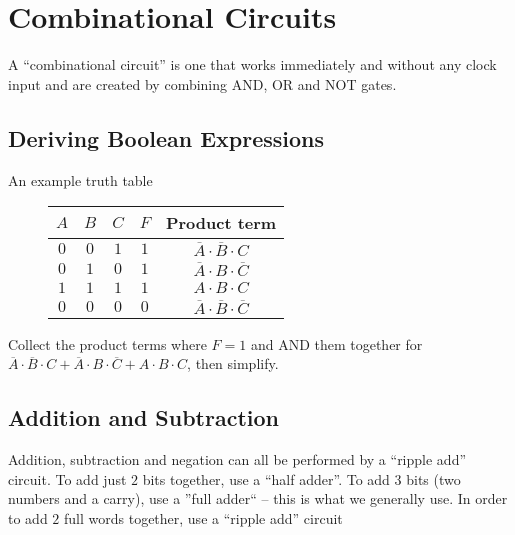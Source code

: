 \section{Combinational Circuits}\label{sec:combinational_circuits}

A ``combinational circuit'' is one that works immediately and without any clock input and are created by combining AND, OR and NOT gates.

\subsection{Deriving Boolean Expressions}\label{sub:deriving_boolean_expressions}

\begin{highlight}{An example truth table}
	\begin{figure}[H]
		\centering
		\begin{tabular}{ccc|c|c}
			\toprule
			\(A\) & \(B\) & \(C\) & \(F\) & Product term                                         \\
			\midrule
			\(0\) & \(0\) & \(1\) & \(1\) & \(\overline{A}\cdot \overline{B}\cdot C\)            \\
			\(0\) & \(1\) & \(0\) & \(1\) & \(\overline{A}\cdot B\cdot \overline{C}\)            \\
			\(1\) & \(1\) & \(1\) & \(1\) & \(A\cdot B\cdot C\)                                  \\
			\(0\) & \(0\) & \(0\) & \(0\) & \(\overline{A}\cdot \overline{B}\cdot \overline{C}\) \\
		\end{tabular}
		\label{fig:example_truth_table}
	\end{figure}
\end{highlight}

\noindent
Collect the product terms where \(F=1\) and AND them together for \(\overline{A}\cdot \overline{B}\cdot C + \overline{A}\cdot B\cdot \overline{C} +A\cdot B\cdot C\), then simplify.

\subsection{Addition and Subtraction}\label{sub:addition_and_subtraction}

Addition, subtraction and negation can all be performed by a ``ripple add'' circuit.
To add just \(2\) bits together, use a ``half adder''.
To add \(3\) bits (two numbers and a carry), use a ''full adder`` -- this is what we generally use.
In order to add \(2\) full words together, use a ``ripple add'' circuit

